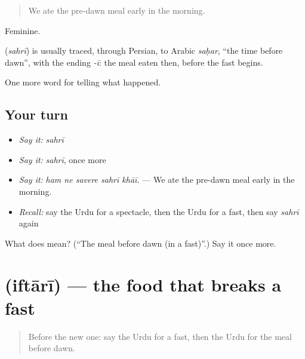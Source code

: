 \begin{quote}
We ate the pre-dawn meal early in the morning.
\end{quote}

Feminine.

\begin{cousinweb}
\textbf{} (\emph{sahrī}) is usually traced, through Persian, to Arabic \emph{saḥar}, \textquotedblleft{}the time before dawn\textquotedblright{}, with the ending \emph{-ī}: the meal eaten then, before the fast begins.
\end{cousinweb}

\begin{grammarlens}[title={What you've built}]
One more word for telling what happened.
\end{grammarlens}

\subsection*{Your turn}
\begin{itemize}
\raggedright
  \item \emph{Say it:} \emph{sahrī}
  \item \emph{Say it:} \emph{sahrī}, once more
  \item \emph{Say it:} \emph{ham ne savere sahrī khāī.} — We ate the pre-dawn meal early in the morning.
  \item \emph{Recall:} say the Urdu for a spectacle, then the Urdu for a fast, then say \emph{sahrī} again
\end{itemize}

\begin{tcolorbox}[breakable,colback=teal!4,colframe=teal!35!black,title={Before you move on}]
What does  mean? (\textquotedblleft{}The meal before dawn (in a fast)\textquotedblright{}.) Say it once more.
\end{tcolorbox}
\section[\texorpdfstring{\ur{افطاری} (iftārī)}{افطاری (iftārī)}]{ (iftārī) — the food that breaks a fast}

\label{lesson:UR-C322-iftari}



\begin{quote}
Before the new one: say the Urdu for a fast, then the Urdu for the meal before dawn.
\end{quote}

